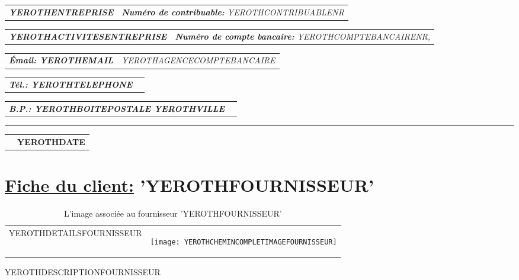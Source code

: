 \documentclass[11pt, YEROTHPAPERSPEC]{article} %
\makeatletter
\newcommand{\headerrow}[2]
{\begin{tabular*}{\linewidth}{l@{\extracolsep{\fill}}r}
	#1 &
	#2 \\
\end{tabular*}}
\newcommand{\emphbold}[1]{\textbf{\emph{#1}}\xspace}
\makeatother
\begin{document}
\bigskip

\headerrow
	{\emphbold{YEROTHENTREPRISE}}
	{\emph{\textbf{Num\'ero de contribuable:} YEROTHCONTRIBUABLENR}}
\headerrow
	{\emphbold{YEROTHACTIVITESENTREPRISE}}
	{\emph{\textbf{Num\'ero de compte bancaire:} YEROTHCOMPTEBANCAIRENR,}}
\headerrow
	{\emphbold{\'Email: YEROTHEMAIL}}
	{\emph{YEROTHAGENCECOMPTEBANCAIRE}}
\headerrow
	{\emphbold{T\'el.: YEROTHTELEPHONE}}
	{}
\headerrow
	{\emphbold{B.P.: YEROTHBOITEPOSTALE YEROTHVILLE}}
	{}
	
\hrule

\headerrow
	{}
	{\textbf{YEROTHDATE}}

\vspace*{0.9cm}


\section*{\underline{Fiche du client:} 'YEROTHFOURNISSEUR'}


\vspace{0.3cm} 

\begin{table}[!htbp]
\begin{tabular}{ll}
\parbox{27em}{
YEROTHDETAILSFOURNISSEUR
}

&

\parbox{15em}{
\begin{center}
\texttt{[image: YEROTHCHEMINCOMPLETIMAGEFOURNISSEUR]}
\caption*{L'image associ\'ee au fournisseur 'YEROTHFOURNISSEUR'}
\end{center}
}
\end{tabular}
\end{table}

\vspace{0.3cm}

YEROTHDESCRIPTIONFOURNISSEUR
\end{document}
